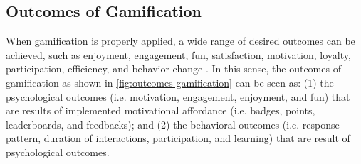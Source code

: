 
\subsection{Outcomes of Gamification}
\label{subsec:outcomes-gamification}

When gamification is properly applied, a wide range of desired outcomes can be achieved, such as enjoyment, engagement, fun, satisfaction, motivation, loyalty, participation, efficiency, and behavior change \cite{HamariKoivistoSarsa2014}. In this sense, the outcomes of gamification as shown in \autoref{fig:outcomes-gamification} can be seen as: (1) the psychological outcomes (i.e. motivation, engagement, enjoyment, and fun) that are results of implemented motivational affordance (i.e. badges, points, leaderboards, and feedbacks); and (2) the behavioral outcomes (i.e. response pattern, duration of interactions, participation, and learning) that are result of psychological outcomes.

